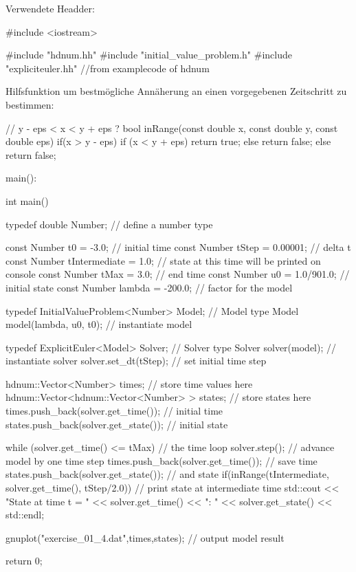 \documentclass[10pt,oneside,a4paper]{scrartcl}
\begin{document}
    Verwendete Headder:
    
    \begin{cppcode}
#include <iostream>

#include "hdnum.hh"
#include "initial_value_problem.h"
#include "expliciteuler.hh"          //from examplecode of hdnum
    \end{cppcode}
    
    Hilfsfunktion um bestmögliche Annäherung an einen vorgegebenen Zeitschritt
    zu bestimmen:
    
    \begin{cppcode}
// y - eps < x < y + eps ?
bool inRange(const double x, const double y, const double eps) {
    if(x > y - eps) {
        if (x < y + eps) {
            return true;
        } else {
            return false;
        }
    } else {
        return false;
    }
}
    \end{cppcode}
    
    \newpage
    
    main():
    
    \begin{cppcode}
int main() {
    typedef double Number;                          // define a number type

    const Number t0 = -3.0;                         // initial time
    const Number tStep = 0.00001;                       // delta t
    const Number tIntermediate = 1.0;               // state at this time will be printed on console
    const Number tMax = 3.0;                        // end time
    const Number u0 = 1.0/901.0;                    // initial state
    const Number lambda = -200.0;                   // factor for the model

    typedef InitialValueProblem<Number> Model;      // Model type
    Model model(lambda, u0, t0);                    // instantiate model

    typedef ExplicitEuler<Model> Solver;            // Solver type
    Solver solver(model);                           // instantiate solver
    solver.set_dt(tStep);                           // set initial time step

    hdnum::Vector<Number> times;                    // store time values here
    hdnum::Vector<hdnum::Vector<Number> > states;   // store states here
    times.push_back(solver.get_time());             // initial time
    states.push_back(solver.get_state());           // initial state

    while (solver.get_time() <= tMax)               // the time loop
    {
      solver.step();                                // advance model by one time step
      times.push_back(solver.get_time());           // save time
      states.push_back(solver.get_state());         // and state
      if(inRange(tIntermediate, solver.get_time(), tStep/2.0)) {        // print state at intermediate time
          std::cout << "State at time t = " << solver.get_time() << ": " << solver.get_state() << std::endl;
      }
    }

    gnuplot("exercise_01_4.dat",times,states);      // output model result

    return 0;
}
    \end{cppcode}
    
\end{document}
